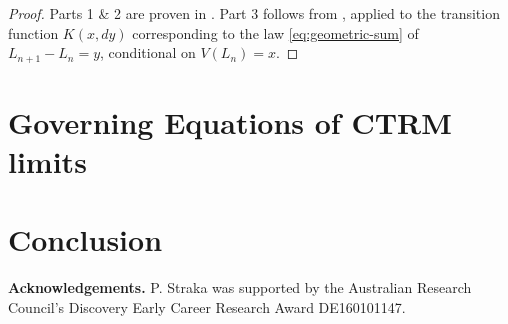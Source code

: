 \documentclass[12pt]{article}
\newcommand{\1}{\mathbf 1}
\begin{document}
\begin{proof}
Parts 1 \& 2 are proven in 
\cite[Proposition 4.1 (i) \& (iii)]{resnick2013extreme}.
Part 3 follows from \cite[Proposition 3.8]{resnick2013extreme}, 
applied to the transition function $K(x,dy)$ corresponding to the law \eqref{eq:geometric-sum} of $L_{n+1} - L_n = y$, conditional on $V(L_n) = x$. 
\end{proof}




\section{Governing Equations of CTRM limits}




\section{Conclusion}


{\bf Acknowledgements.} P. Straka was supported by the Australian Research Council’s Discovery Early Career Research Award DE160101147.




\end{document}
